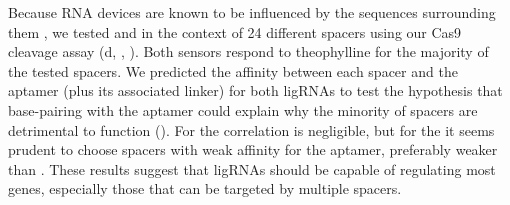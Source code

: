 \documentclass[10pt,oneside]{article}
\begin{document}
% 
% 
% 
% 
% 
%
Because RNA devices are known to be influenced by the sequences surrounding them \autocite{liang2012}, we tested \ligrnaF{} and \ligrnaB{} in the context of 24 different spacers using our \invitro{} Cas9 cleavage assay (d, , ).  Both sensors respond to theophylline for the majority of the tested spacers.  We predicted the affinity between each spacer and the aptamer (plus its associated linker) for both ligRNAs to test the hypothesis that base-pairing with the aptamer could explain why the minority of spacers are detrimental to function ().  For \ligrnaF{} the correlation is negligible, but for the \ligrnaB{} it seems prudent to choose spacers with weak affinity for the aptamer, preferably weaker than .  These results suggest that ligRNAs should be capable of regulating most genes, especially those that can be targeted by multiple spacers.


% 
% 
% 
%
% 
%
\end{document}
